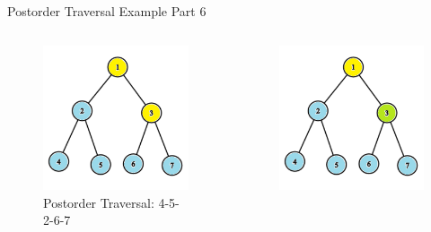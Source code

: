 \documentclass[aspectratio=169]{beamer}%
\begin{document}
\begin{frame}{Postorder Traversal Example Part 6}
    \begin{columns}
        \begin{column}{0.32\textwidth}
            \begin{figure}
                \centering
                \includegraphics[width = .9\linewidth]{tree-post 16.png}
                \caption{Postorder Traversal: 4-5-2-6-7}
            \end{figure}
        \end{column}
        \hfill
        \begin{column}{0.32\textwidth}
            \begin{figure}
                \centering
                \includegraphics[width = .9\linewidth]{tree-post 17.png}

\end{figure}
\end{column}
\end{columns}
\end{frame}
\end{document}
